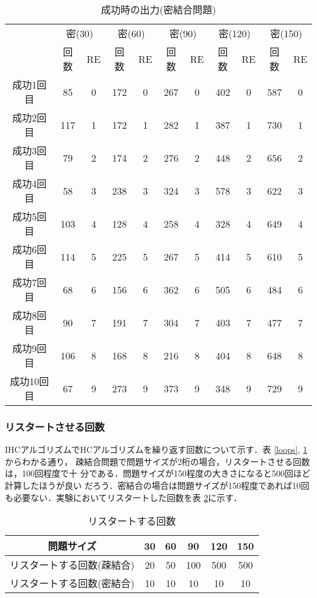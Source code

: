 \documentclass[a4j]{jarticle}
\begin{document}
\begin{table}[htb]
 \begin{center}
  \begin{tabular}[tb]{|c||c|c||c|c||c|c||c|c||c|c|} \hline
& \multicolumn{2}{|c||}{密(30)} & \multicolumn{2}{|c||}{密(60)} &
   \multicolumn{2}{|c||}{密(90)} & \multicolumn{2}{|c||}{密(120)} &
   \multicolumn{2}{|c|}{密(150)}  \\   \cline{2-11}
   & 回数& RE & 回数& RE & 回数& RE & 回数& RE & 回数& RE  \\ \hline \hline
   成功1回目& 85& 0& 172& 0& 267& 0& 402& 0& 587& 0\\ \hline
   成功2回目& 117& 1& 172& 1& 282& 1& 387& 1& 730& 1\\ \hline
   成功3回目& 79& 2& 174& 2& 276& 2& 448& 2& 656& 2\\ \hline
   成功4回目& 58& 3& 238& 3& 324& 3& 578& 3& 622& 3\\ \hline
   成功5回目& 103& 4& 128& 4& 258& 4& 328& 4& 649& 4\\ \hline
   成功6回目& 114& 5& 225& 5& 267& 5& 414& 5& 610& 5\\ \hline
   成功7回目& 68& 6& 156& 6& 362& 6& 505& 6& 484& 6\\ \hline
   成功8回目& 90& 7& 191& 7& 304& 7& 403& 7& 477& 7\\ \hline
   成功9回目& 106& 8& 168& 8& 216& 8& 404& 8& 648& 8\\ \hline
   成功10回目& 67& 9& 273& 9& 373& 9& 348& 9& 729& 9\\ \hline
  \end{tabular}
  \caption{成功時の出力(密結合問題)}
  \label{loopd}
 \end{center}
\end{table}

\subsubsection*{リスタートさせる回数}
IHCアルゴリズムでHCアルゴリズムを繰り返す回数について示す．表
\ref{loops}, \ref{loopd}からわかる通り，
疎結合問題で問題サイズが2桁の場合，リスタートさせる回数は，100回程度で十
分である．問題サイズが150程度の大きさになると500回ほど計算したほうが良い
だろう．密結合の場合は問題サイズが150程度であれば10回も必要ない．実験においてリスタートした回数を表
\ref{restart}に示す．

\begin{table}[htb]
 \begin{center}
  \begin{tabular}[t]{|c|c|c|c|c|c|} \hline
   問題サイズ& 30& 60& 90& 120& 150 \\ \hline
   リスタートする回数(疎結合)& 20& 50& 100& 500& 500 \\ \hline
   リスタートする回数(密結合)& 10& 10& 10& 10& 10\\ \hline
  \end{tabular}
  \caption{リスタートする回数}
  \label{restart}
 \end{center}
\end{table}
\end{document}
